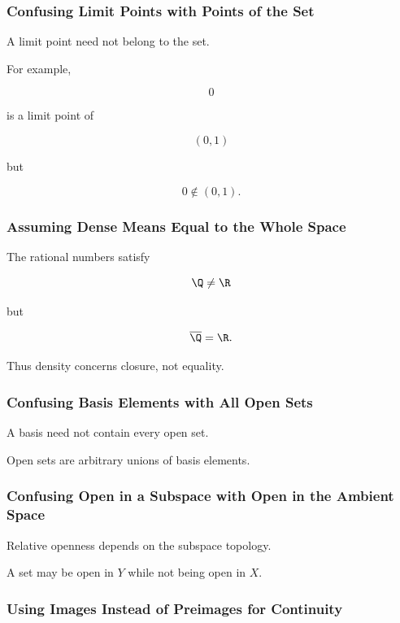 \subsubsection{Confusing Limit Points with Points of the Set}

A limit point need not belong to the set.

For example,

\[
0
\]

is a limit point of

\[
(0,1)
\]

but

\[
0\notin(0,1).
\]

\subsubsection{Assuming Dense Means Equal to the Whole Space}

The rational numbers satisfy

\[
\Q\neq\R
\]

but

\[
\overline{\Q}=\R.
\]

Thus density concerns closure, not equality.

\subsubsection{Confusing Basis Elements with All Open Sets}

A basis need not contain every open set.

Open sets are arbitrary unions of basis elements.

\subsubsection{Confusing Open in a Subspace with Open in the Ambient Space}

Relative openness depends on the subspace topology.

A set may be open in \(Y\) while not being open in \(X\).

\subsubsection{Using Images Instead of Preimages for Continuity}

